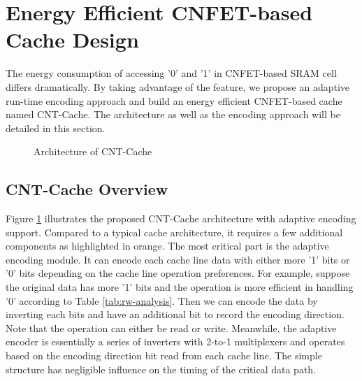 \section{Energy Efficient CNFET-based Cache Design} \label{sec:warp}
The energy consumption of accessing '0' and '1' in CNFET-based SRAM cell 
differs dramatically. By taking advantage of the feature, we propose 
an adaptive run-time encoding approach and build an energy efficient 
CNFET-based cache named CNT-Cache. The architecture as well as the 
encoding approach will be detailed in this section.

\begin{figure}
    \caption{Architecture of CNT-Cache}
\label{fig:architecture}
\vspace{-1em}
\end{figure}

\subsection{CNT-Cache Overview}
Figure \ref{fig:architecture} illustrates the proposed CNT-Cache 
architecture with adaptive encoding support.
Compared to a typical cache architecture, it requires a few additional 
components as highlighted in orange. The most critical part is the 
adaptive encoding module. It can encode each cache line data with 
either more '1' bits or '0' bits depending on the cache line operation 
preferences. For example, suppose the original data has more '1' bits and 
the operation is more efficient in handling '0' according 
to Table \ref{tab:rw-analysis}. Then we can encode the 
data by inverting each bits and have an additional bit to record the encoding 
direction. Note that the operation can either be read or write. Meanwhile, 
the adaptive encoder is essentially a series of inverters
with 2-to-1 multiplexers and operates based on the encoding direction bit read from 
each cache line. The simple structure has negligible influence 
on the timing of the critical data path. 


